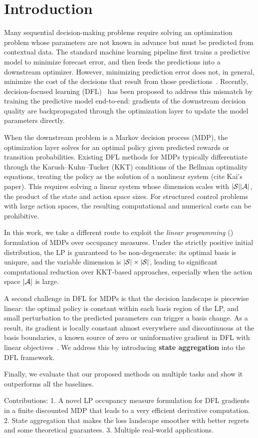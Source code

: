 \section{Introduction}

Many sequential decision-making problems require solving an optimization problem whose parameters are not known in advance but must be predicted from contextual data. The standard machine learning pipeline first trains a predictive model to minimize forecast error, and then feeds the predictions into a downstream optimizer. However, minimizing prediction error does not, in general, minimize the cost of the decisions that result from those predictions~\cite{}. Recently, decision-focused learning (DFL)~\cite{} has been proposed to address this mismatch by training the predictive model end-to-end: gradients of the downstream decision quality are backpropagated through the optimization layer to update the model parameters directly.

When the downstream problem is a Markov decision process (MDP), the optimization layer solves for an optimal policy given predicted rewards or transition probabilities. Existing DFL methods for MDPs typically differentiate through the Karush--Kuhn--Tucker (KKT) conditions of the Bellman optimality equations, treating the policy as the solution of a nonlinear system (cite Kai's paper). This requires solving a linear system whose dimension scales with $|{\mathcal{S}}||{\mathcal{A}}|$, the product of the state and action space sizes. For structured control problems with large action spaces, the resulting computational and numerical costs can be prohibitive.

In this work, we take a different route to exploit the \emph{linear programming} (\LP) formulation of MDPs over occupancy measures. Under the strictly positive initial distribution, the LP is guaranteed to be non-degenerate: its optimal basis is uniqure, and the variable dimension is $|{\mathcal{S}}| \times |{\mathcal{S}}|$, leading to significant computational reduction over KKT-based approaches, especially when the action space $|{\mathcal{A}}|$ is large.

A second challenge in DFL for MDPs is that the decision landscape is piecewise linear: the optimal policy is constant within each basis region of the LP, and small perturbation to the predicted parameters can trigger a basis change. As a result, its gradient is locally constant almost everywhere and discontinuous at the basis boundaries, a known source of zero or uninformative gradient in DFL with linear objectives~\citep{mandi2025minimizing, berthet2020learning, elmachtoub2022smart}. We address this by introducing \textbf{state aggregation} into the DFL framework. 

Finally, we evaluate that our proposed methods on multiple tasks and show it outperforms all the baselines.

Contributions:
1. A novel LP occupancy measure formulation for DFL gradients in a finite discounted MDP that leads to a very efficient derivative computation.
2. State aggregation that makes the loss landscape smoother with better regrets and some theoretical guarantees.
3. Multiple real-world applications.